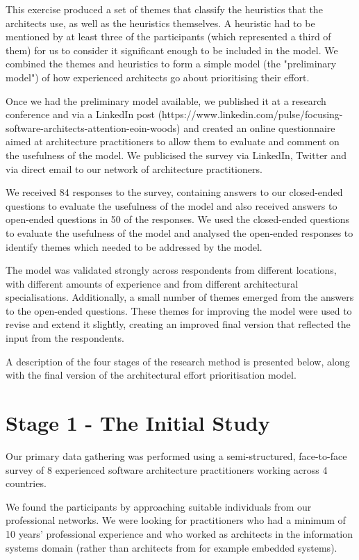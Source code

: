 This exercise produced a set of themes that classify the heuristics that the architects use, as well as the heuristics themselves.  A heuristic had to be mentioned by at least three of the participants (which represented a third of them) for us to consider it significant enough to be included in the model.  We combined the themes and heuristics to form a simple model (the "preliminary model") of how experienced architects go about prioritising their effort. 

Once we had the preliminary model available, we published it at a research conference \cite{woods2017-archpriorisation} and via a LinkedIn post (https://www.linkedin.com/pulse/focusing-software-architects-attention-eoin-woods) and created an online questionnaire \cite{gillham2000-questionnaire} aimed at architecture practitioners to allow them to evaluate and comment on the usefulness of the model.  We publicised the survey via LinkedIn, Twitter and via direct email to our network of architecture practitioners.

We received 84 responses to the survey, containing answers to our closed-ended questions to evaluate the usefulness of the model and also received answers to open-ended questions in 50 of the responses.  We used the closed-ended questions to evaluate the usefulness of the model and analysed the open-ended responses to identify themes which needed to be addressed by the model.

The model was validated strongly across respondents from different locations, with different amounts of experience and from different architectural specialisations. Additionally, a small number of themes emerged from the answers to the open-ended questions.  These themes for improving the model were used to revise and extend it slightly, creating an improved final version that reflected the input from the respondents.

A description of the four stages of the research method is presented below, along with the final version of the architectural effort prioritisation model.

\section{Stage 1 - The Initial Study}

Our primary data gathering was performed using a semi-structured, face-to-face survey of 8 experienced software architecture practitioners working across 4 countries.

We found the participants by approaching suitable individuals from our professional networks.  We were looking for practitioners who had a minimum of 10 years' professional experience and who worked as architects in the information systems domain (rather than architects from \textendash for example \textendash embedded systems).  

